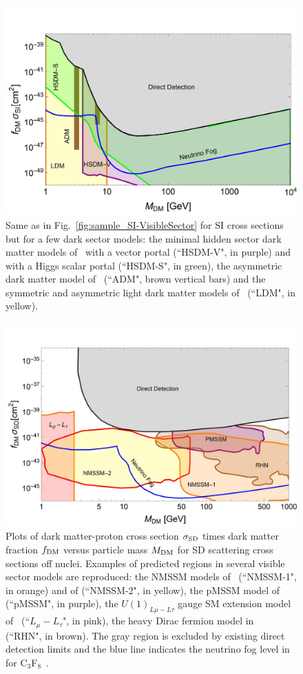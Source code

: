 
\begin{figure}[h]
\begin{center}
\includegraphics[width=0.65\columnwidth]{figures/sigmap_plot.jpg}
\caption{Same as in Fig.~\ref{fig:sample_SI-VisibleSector} for SI cross sections but for a few dark sector models: the minimal hidden sector dark matter models of~\cite{Evans:2017kti} with a vector portal (``HSDM-V", in purple) and with a Higgs scalar portal (``HSDM-S", in green), the asymmetric dark matter model of~\cite{Cohen:2010kn} (``ADM", brown vertical bars) and the symmetric and asymmetric light dark matter models of~\cite{Lin:2011gj} (``LDM", in yellow).}
\label{fig:sample_SI-DarkSector}
\end{center}
\end{figure}

\begin{figure}[t]
\begin{center}
\includegraphics[width=0.65\columnwidth]{figures/sigmapSD_plot.jpg}
\caption{Plots of dark matter-proton cross section $\sigma_{\rm SD}$  times dark matter fraction $f_{\rm DM}$ versus particle mass $M_{\rm DM}$ for SD scattering cross sections off nuclei. Examples of predicted regions in several visible sector models are reproduced: the NMSSM models of~\cite{Lopez-Fogliani:2021qpq} (``NMSSM-1", in orange) and of \cite{Wang:2020xta} (``NMSSM-2", in yellow), the pMSSM model of~\cite{VanBeekveld:2021tgn} (``pMSSM", in purple), the $U(1)_{L\mu -L\tau}$ gauge SM extension model of~\cite{Singirala:2021gok} (``$L_\mu - L_\tau$", in pink), the heavy Dirac fermion model in~\cite{Barger:2008qd} (``RHN", in brown). The gray region is excluded by existing direct detection limits and the blue line indicates the neutrino fog level in for C$_3$F$_8$~\cite{Ruppin:2014bra}.}
\label{fig:sample_SD-VisibleSector}
\end{center}
\end{figure}

